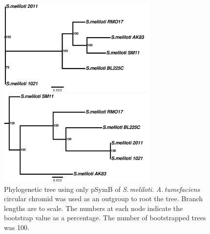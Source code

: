 \documentclass[11pt]{article}
\newcommand{\smel}{\textit{S.\,meliloti}\xspace}
\newcommand{\agro}{\textit{A.\,tumefaciens}\xspace}
\begin{document}
		\begin{figure}
		\begin{center}
			\includegraphics[width=0.7\textwidth]{./figs/pSymA_all_blocks_branchlengths_rooted_outtree.pdf}
			\caption{\label{fig:sinoPAtree} Phylogenetic tree using only pSymA of \smel. \agro circular plasmid was used as an outgroup to root the tree. Branch lengths are to scale. The numbers at each node indicate the bootstrap value as a percentage. The number of bootstrapped trees was 100.}
		\end{center}
		\vspace*{\floatsep}%
			\begin{center}
				
				\includegraphics[width=0.7\textwidth]{./figs/pSymB_all_blocks_branchlengths_rooted_outtree.pdf}
				\caption{\label{fig:sinoPBtree} Phylogenetic tree using only pSymB of \smel. \agro circular chromid was used as an outgroup to root the tree. Branch lengths are to scale. The numbers at each node indicate the bootstrap value as a percentage. The number of bootstrapped trees was 100.}
			\end{center}
		\end{figure}
	
\end{document}
